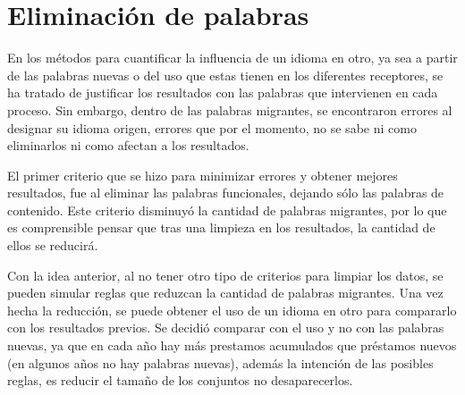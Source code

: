 \chapter{Eliminación de palabras}


En los métodos para cuantificar la influencia de un idioma en otro, ya sea a partir de las palabras nuevas o del uso que estas tienen en los diferentes receptores, se ha tratado de justificar los resultados con las palabras que intervienen en cada proceso. Sin embargo, dentro de las palabras migrantes, se encontraron errores al designar su idioma origen, errores que por el momento, no se sabe ni como eliminarlos ni como afectan a los resultados. 

El primer criterio que se hizo para minimizar errores y obtener mejores resultados, fue al eliminar las palabras funcionales, dejando sólo las palabras de contenido. Este criterio disminuyó la cantidad de palabras migrantes, por lo que es comprensible pensar que tras una limpieza en los resultados, la cantidad de ellos se reducirá. 

Con la idea anterior, al no tener otro tipo de criterios para limpiar los datos, se pueden simular reglas que reduzcan la cantidad de palabras migrantes. Una vez hecha la reducción, se puede obtener el uso de un idioma en otro para compararlo con los resultados previos. Se decidió comparar con el uso y no con las palabras nuevas, ya que en cada año hay más prestamos acumulados que préstamos nuevos (en algunos años no hay palabras nuevas), además la intención de las posibles reglas, es reducir el tamaño de los conjuntos no desaparecerlos.

